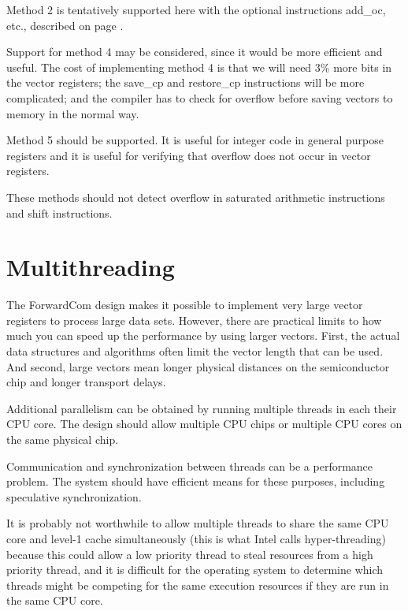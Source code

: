 \documentclass[forwardcom.tex]{subfiles}
\begin{document}
Method 2 is tentatively supported here with the optional instructions add\_oc, etc., described on page \pageref{table:addOcInstruction}. 
\vspace{2mm}

Support for method 4 may be considered, since it would be more efficient and useful. The cost of implementing method 4 is that we will need 3\% more bits in the vector registers; the save\_cp and restore\_cp instructions will be more complicated; and the compiler has to check for overflow before saving vectors to memory in the normal way. 
\vspace{2mm}

Method 5 should be supported. It is useful for integer code in general purpose registers and it is useful for verifying that overflow does not occur in vector registers.
\vspace{2mm}

These methods should not detect overflow in saturated arithmetic instructions and shift instructions.

\section{Multithreading}
The ForwardCom design makes it possible to implement very large vector registers to process large data sets. However, there are practical limits to how much you can speed up the performance by using larger vectors. First, the actual data structures and algorithms often limit the vector length that can be used. And second, large vectors mean longer physical distances on the semiconductor chip and longer transport delays.
\vspace{2mm}

Additional parallelism can be obtained by running multiple threads in each their CPU core. The design should allow multiple CPU chips or multiple CPU cores on the same physical chip.
\vspace{2mm}

Communication and synchronization between threads can be a performance problem. The system should have efficient means for these purposes, including speculative synchronization.
\vspace{2mm}

It is probably not worthwhile to allow multiple threads to share the same CPU core and level-1 cache simultaneously (this is what Intel calls hyper-threading) because this could allow a low priority thread to steal resources from a high priority thread, and it is difficult for the operating system to determine which threads might be competing for the same execution resources if they are run in the same CPU core.
\vspace{2mm}
\end{document}
